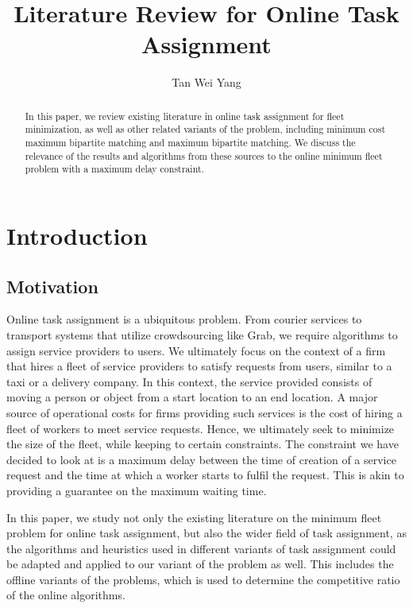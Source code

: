 \documentclass[urop]{socreport}
\begin{document}
\title{Literature Review for Online Task Assignment}
\author{Tan Wei Yang}

\newcommand{\A}{\mathcal{A}}
\newcommand{\R}{\mathcal{R}}
\newcommand{\W}{\mathcal{W}}

\maketitle
\begin{abstract}
In this paper, we review existing literature in online task assignment for fleet minimization, as well as other related variants of the problem, including minimum cost maximum bipartite matching and maximum bipartite matching. We discuss the relevance of the results and algorithms from these sources to the online minimum fleet problem with a maximum delay constraint.
\end{abstract}

\tableofcontents 

\chapter{Introduction}


\section{Motivation}
Online task assignment is a ubiquitous problem. From courier services to transport systems that utilize crowdsourcing like Grab, we require algorithms to assign service providers to users. We ultimately focus on the context of a firm that hires a fleet of service providers to satisfy requests from users, similar to a taxi or a delivery company. In this context, the service provided consists of moving a person or object from a start location to an end location. A major source of operational costs for firms providing such services is the cost of hiring a fleet of workers to meet service requests. Hence, we ultimately seek to minimize the size of the fleet, while keeping to certain constraints. The constraint we have decided to look at is a maximum delay between the time of creation of a service request and the time at which a worker starts to fulfil the request. This is akin to providing a guarantee on the maximum waiting time.

In this paper, we study not only the existing literature on the minimum fleet problem for online task assignment, but also the wider field of task assignment, as the algorithms and heuristics used in different variants of task assignment could be adapted and applied to our variant of the problem as well. This includes the offline variants of the problems, which is used to determine the competitive ratio of the online algorithms.
\end{document}
